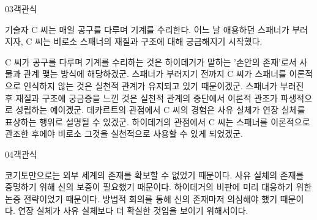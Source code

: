\documentclass[fs85,seriesWit]{korfarm-base}
\begin{document}
\begin{kfQBlock}{03}{객관식}
\begin{kfEvidence}기술자 C 씨는 매일 공구를 다루며 기계를 수리한다. 어느 날 애용하던 스패너가 부러지자, C 씨는 비로소 스패너의 재질과 구조에 대해 궁금해지기 시작했다.\end{kfEvidence}
\begin{kfChoices}
\kfChoice C 씨가 공구를 다루며 기계를 수리하는 것은 하이데거가 말하는 '손안의 존재'로서 사물과 관계 맺는 방식에 해당하겠군.
\kfChoice 스패너가 부러지기 전까지 C 씨가 스패너를 이론적으로 인식하지 않는 것은 실천적 관계가 유지되고 있기 때문이겠군.
\kfChoice 스패너가 부러진 후 재질과 구조에 궁금증을 느낀 것은 실천적 관계의 중단에서 이론적 관조가 파생적으로 성립하는 예이겠군.
\kfChoice 데카르트의 관점에서 C 씨의 경험은 사유 실체가 연장 실체를 표상하는 행위로 설명될 수 있겠군.
\kfChoice 하이데거의 관점에서 C 씨는 스패너를 이론적으로 관조한 후에야 비로소 그것을 실천적으로 사용할 수 있게 되었겠군.
\end{kfChoices}
\end{kfQBlock}

\begin{kfQBlock}{04}{객관식}
\begin{kfChoices}
\kfChoice 코기토만으로는 외부 세계의 존재를 확보할 수 없었기 때문이다.
\kfChoice 사유 실체의 존재를 증명하기 위해 신의 보증이 필요했기 때문이다.
\kfChoice 하이데거의 비판에 미리 대응하기 위한 논증 전략이었기 때문이다.
\kfChoice 방법적 회의를 통해 신의 존재마저 의심해야 했기 때문이다.
\kfChoice 연장 실체가 사유 실체보다 더 확실한 것임을 보이기 위해서이다.
\end{kfChoices}
\end{kfQBlock}

\kfEndMC
\end{document}
